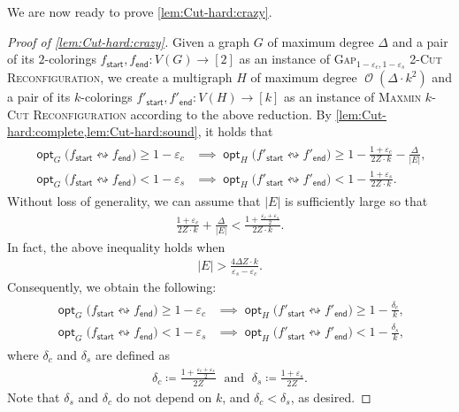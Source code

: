 \documentclass[11pt,fleqn]{article}
\renewcommand{\geq}{\geqslant}
\renewcommand{\epsilon}{\varepsilon}
\newcommand{\prb}[1]{\textsc{#1}\xspace}
\newcommand{\reco}{\leftrightsquigarrow}
\newcommand{\defeq}{\coloneq}
\DeclareMathOperator{\bigO}{\mathcal{O}}
\DeclareMathOperator{\opt}{\mathsf{opt}}
\newcommand{\sss}{\mathsf{start}}
\newcommand{\ttt}{\mathsf{end}}
\newcommand{\f}{f}
\newcommand{\MMkCutReconf}{\prb{Maxmin $k$-Cut Reconfiguration}}
\newcommand{\twoCutReconf}{\prb{2-Cut Reconfiguration}}
\theoremstyle{definition}
\numberwithin{equation}{section}
\begin{document}
We are now ready to prove \cref{lem:Cut-hard:crazy}.
\begin{proof}[Proof of \cref{lem:Cut-hard:crazy}]
Given
a graph $G$ of maximum degree $\Delta$ and
a pair of its $2$-colorings $\f_\sss,\f_\ttt \colon V(G) \to [2]$
as an instance of \prb{Gap$_{1-\epsilon_c,1-\epsilon_s}$ \twoCutReconf},
we create a multigraph $H$ of maximum degree $\bigO(\Delta \cdot k^2)$ and
a pair of its $k$-colorings $\f'_\sss,\f'_\ttt \colon V(H) \to [k]$
as an instance of \MMkCutReconf
according to the above reduction.
By \cref{lem:Cut-hard:complete,lem:Cut-hard:sound}, it holds that
\begin{align}
\begin{aligned}
    \opt_G\bigl(\f_\sss \reco \f_\ttt\bigr) \geq 1-\epsilon_c
    & \implies \opt_H\bigl(\f'_\sss \reco \f'_\ttt\bigr) \geq 1 - \frac{1+\epsilon_c}{2Z \cdot k} - \frac{\Delta}{|E|}, \\
    \opt_G\bigl(\f_\sss \reco \f_\ttt\bigr) < 1-\epsilon_s
    & \implies \opt_H\bigl(\f'_\sss \reco \f'_\ttt\bigr) < 1 - \frac{1+\epsilon_s}{2Z \cdot k}.
\end{aligned}
\end{align}
Without loss of generality, we can assume that
$|E|$ is sufficiently large so that
\begin{align}
    \frac{1+\epsilon_c}{2Z \cdot k} + \frac{\Delta}{|E|}
    < \frac{1+\frac{\epsilon_c+\epsilon_s}{2}}{2Z \cdot k}.
\end{align}
In fact, the above inequality holds when
\begin{align}
    |E| > \frac{4\Delta Z \cdot k}{\epsilon_s - \epsilon_c}.
\end{align}
Consequently, we obtain the following:
\begin{align}
\begin{aligned}
    \opt_G\bigl(\f_\sss \reco \f_\ttt\bigr) \geq 1-\epsilon_c
    & \implies \opt_H\bigl(\f'_\sss \reco \f'_\ttt\bigr) \geq 1 - \frac{\delta_c}{k}, \\
    \opt_G\bigl(\f_\sss \reco \f_\ttt\bigr) < 1-\epsilon_s
    & \implies \opt_H\bigl(\f'_\sss \reco \f'_\ttt\bigr) < 1 - \frac{\delta_s}{k},
\end{aligned}
\end{align}
where $\delta_c$ and $\delta_s$ are defined as 
\begin{align}
    \delta_c \defeq \frac{1+\frac{\epsilon_c+\epsilon_s}{2}}{2Z} \;\text{ and }\;
    \delta_s \defeq \frac{1+\epsilon_s}{2Z}.
\end{align}
Note that $\delta_s$ and $\delta_c$ do not depend on $k$, and $\delta_c < \delta_s$, as desired.
\end{proof}
\end{document}
